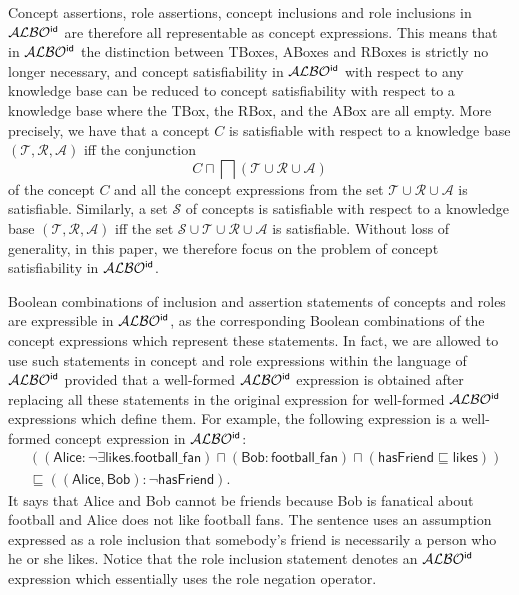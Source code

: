\documentclass[leqno
,pdflatex
,prodmode
,acmtocl
]{acmsmall}
\newcommand{\mathcmd}[1]{\ensuremath{#1}\xspace}
\newcommand{\dlfont}{\mathcal}
\newcommand{\dl}[1]{\mathcmd{\dlfont{#1}}}
\newcommand{\idRole}{\mathcmd{\textsf{\upshape\mdseries id}}}
\newcommand{\ALBOid}{\dl{ALBO\smash[t]{\mbox{${}^{\idRole}$}}}}
\def\And{\sqcap}
\def\Not{\neg}
\newcommand{\subsumed}{\sqsubseteq}
\def\bigAnd{\bigsqcap}
\begin{document}
Concept assertions, role assertions, concept inclusions and role
inclusions in \ALBOid are therefore all representable as concept
expressions.
This means that in \ALBOid the distinction between TBoxes, ABoxes and
RBoxes is strictly no longer necessary, and concept satisfiability in
\ALBOid with respect to any knowledge base can be reduced to concept
satisfiability with respect to a knowledge base where the TBox, the RBox,
and the ABox are all empty.
More precisely, we have that a concept $C$ is satisfiable with respect to a knowledge
base $(\mathcal{T},\mathcal{R},\mathcal{A})$ iff\label{page: eliminating knowledge base} the conjunction 
\[
C\And\bigAnd (\mathcal{T}\cup\mathcal{R}\cup\mathcal{A})
\]
of the concept
$C$ and all the concept expressions from the set $\mathcal{T}\cup\mathcal{R}\cup\mathcal{A}$
is satisfiable. 
Similarly, a set $\mathcal{S}$ of concepts is satisfiable with
respect to a knowledge base  $(\mathcal{T},\mathcal{R},\mathcal{A})$ iff the set $\mathcal{S}\cup
\mathcal{T}\cup\mathcal{R}\cup\mathcal{A}$ is satisfiable.
Without loss of generality, in this paper, we therefore focus on the
problem of concept satisfiability in \ALBOid.

Boolean combinations of inclusion and assertion statements
of concepts and roles are expressible in \ALBOid, as the
corresponding Boolean combinations of the concept expressions which represent
these statements.
In fact,  
we are allowed to use such statements in concept and role expressions
within the language of \ALBOid provided that 
a well-formed \ALBOid expression is obtained
after replacing  
all these statements 
in the original expression
for well-formed \ALBOid expressions which define them.
For example, the following expression is a well-formed concept expression in \ALBOid:
\begin{eqnarray*}
& (\left(\textsf{Alice}\!:\!\Not\exists\textsf{likes}.\textsf{football\_fan}\right)\And
\left(\textsf{Bob}\!:\!\textsf{football\_fan}\right)\And
\left(\textsf{hasFriend}\subsumed\textsf{likes}\right))\\
& \subsumed
((\textsf{Alice},\textsf{Bob})\!:\!\Not\textsf{hasFriend}).
\end{eqnarray*}
It says that Alice and Bob cannot be friends because Bob is fanatical
about football and Alice does not like football fans.
The sentence uses an assumption expressed as a role inclusion that
somebody's friend is necessarily a person who he or she likes.
Notice that the role inclusion statement denotes an \ALBOid
expression which essentially uses the role negation operator.
\end{document}
